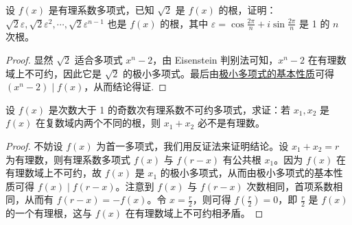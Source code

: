 \documentclass[../../main.tex]{subfiles}%
\begin{document}
\begin{example}
设 $f(x)$ 是有理系数多项式，已知 $\sqrt{2}$ 是 $f(x)$ 的根，证明：$\sqrt{2} \varepsilon, \sqrt{2} \varepsilon^2, \cdots, \sqrt{2} \varepsilon^{n-1}$ 也是 $f(x)$ 的根，其中 $\varepsilon = \cos \frac{2\pi}{n} + i \sin \frac{2\pi}{n}$ 是 1 的 $n$ 次根。  
\end{example}
\begin{proof}

显然 $\sqrt{2}$ 适合多项式 $x^n - 2$，由 Eisenstein 判别法可知，$x^n - 2$ 在有理数域上不可约，因此它是 $\sqrt{2}$ 的极小多项式。最后由\hyperref[proposition:极小多项式的基本性质]{极小多项式的基本性质}可得 $(x^n - 2) \mid f(x)$，从而结论得证.

\end{proof}

\begin{example}
设 $f(x)$ 是次数大于 1 的奇数次有理系数不可约多项式，求证：若 $x_1, x_2$ 是 $f(x)$ 在复数域内两个不同的根，则 $x_1 + x_2$ 必不是有理数。
\end{example}
\begin{proof}

不妨设 $f(x)$ 为首一多项式，我们用反证法来证明结论。设 $x_1 + x_2 = r$ 为有理数，则有理系数多项式 $f(x)$ 与 $f(r - x)$ 有公共根 $x_1$。因为 $f(x)$ 在有理数域上不可约，故 $f(x)$ 是 $x_1$ 的极小多项式，从而由极小多项式的基本性质可得 $f(x) \mid f(r - x)$。注意到 $f(x)$ 与 $f(r - x)$ 次数相同，首项系数相同，从而有 $f(r - x) = -f(x)$。令 $x = \frac{r}{2}$，则可得 $f\left(\frac{r}{2}\right) = 0$，即 $\frac{r}{2}$ 是 $f(x)$ 的一个有理根，这与 $f(x)$ 在有理数域上不可约相矛盾。

\end{proof}
\end{document}

